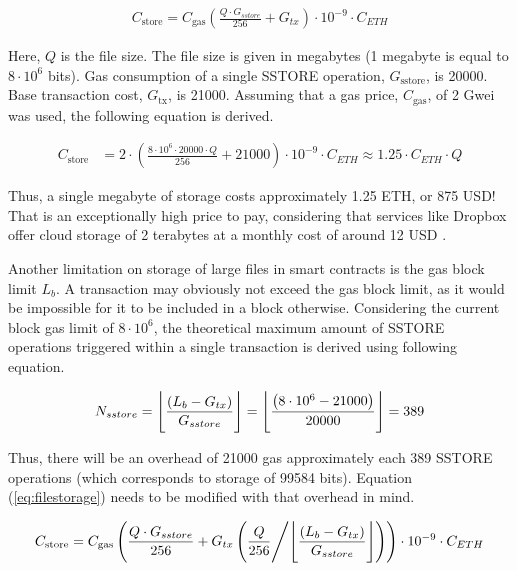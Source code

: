 \begin{align} \label{eq:filestorage}
C_{\mathrm{store}} = C_{\mathrm{gas}}\left(\frac{Q \cdot G_{sstore}}{256} + G_{tx}\right) \cdot 10^{-9} \cdot C_{ETH}  
\end{align}

Here, $Q$ is the file size. The file size is given in megabytes (1 megabyte is equal to $8 \cdot 10^6$ bits). Gas consumption of a single {\small SSTORE} operation, $G_{\mathrm{sstore}}$, is 20000. Base transaction cost, $G_{\mathrm{tx}}$, is 21000. Assuming that a gas price, $C_{\mathrm{gas}}$, of 2 Gwei was used, the following equation is derived.

\begin{align}
C_{\mathrm{store}} &= 2 \cdot \left(\frac{8 \cdot 10^6 \cdot 20000 \cdot Q}{256} + 21000\right) \cdot 10^{-9} \cdot C_{ETH} \approx 1.25 \cdot C_{ETH} \cdot Q
\end{align}

Thus, a single megabyte of storage costs approximately 1.25 ETH, or 875 USD! That is an exceptionally high price to pay, considering that services like Dropbox offer cloud storage of 2 terabytes at a monthly cost of around 12 USD \citep{dropbox}.

Another limitation on storage of large files in smart contracts is the gas block limit $L_b$. A transaction may obviously not exceed the gas block limit, as it would be impossible for it to be included in a block otherwise. Considering the current block gas limit of $8 \cdot 10^6$, the theoretical maximum amount of {\small SSTORE} operations triggered within a single transaction is derived using following equation.

\begin{align}
N_{sstore} = \floor[\Bigg]{\frac{\left(L_b - G_{tx} \right)}{G_{sstore}}} = \floor[\Bigg]{\frac{\left(8 \cdot 10^6 - 21000\right)}{20000}} = 389
\end{align}

Thus, there will be an overhead of 21000 gas approximately each 389 {\small SSTORE} operations (which corresponds to storage of 99584 bits). Equation (\ref{eq:filestorage}) needs to be modified with that overhead in mind.

\begin{align} \label{eq:newstorecost}
C_{\mathrm{store}} = C_{\mathrm{gas}}\left(\frac{Q \cdot G_{sstore}}{256} + G_{tx}\left(\frac{Q}{256}\middle/\floor[\Bigg]{\frac{\left(L_b - G_{tx} \right)}{G_{sstore}}}\right)\right) \cdot 10^{-9} \cdot C_{ETH} 
\end{align}

